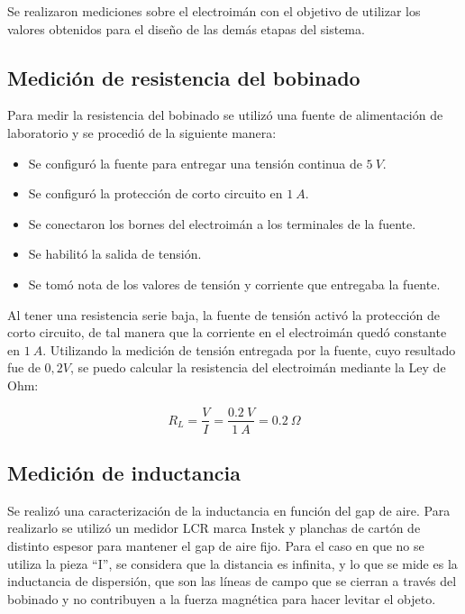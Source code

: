 \noindent Se realizaron mediciones sobre el electroimán con el objetivo de utilizar los valores obtenidos para el diseño de las demás etapas del sistema.

\subsection{Medición de resistencia del bobinado}

\noindent Para medir la resistencia del bobinado se utilizó una fuente de alimentación de laboratorio y se procedió de la siguiente manera:

\begin{itemize}
	\item Se configuró la fuente para entregar una tensión continua de $5\:V$.
	\item Se configuró la protección de corto circuito en $1\:A$.
	\item Se conectaron los bornes del electroimán a los terminales de la fuente.
	\item Se habilitó la salida de tensión.
	\item Se tomó nota de los valores de tensión y corriente que entregaba la fuente.
\end{itemize}

\noindent Al tener una resistencia serie baja, la fuente de tensión activó la protección de corto circuito, de tal manera que la corriente en el electroimán quedó constante en $1\:A$. Utilizando la medición de tensión entregada por la fuente, cuyo resultado fue de $0,2 V$, se puedo calcular la resistencia del electroimán mediante la Ley de Ohm:

\begin{equation}
	R_{L}=\frac{V}{I}=\frac{0.2\:V}{1\:A}=0.2\:\Omega
\end{equation}

\subsection{Medición de inductancia}

\noindent Se realizó una caracterización de la inductancia en función del gap de aire. Para realizarlo se utilizó un medidor LCR marca Instek y planchas de cartón de distinto espesor para mantener el gap de aire fijo. Para el caso en que no se utiliza la pieza ``I'', se considera que la distancia es infinita, y lo que se mide es la inductancia de dispersión, que son las líneas de campo que se cierran a través del bobinado y no contribuyen a la fuerza magnética para hacer levitar el objeto.


